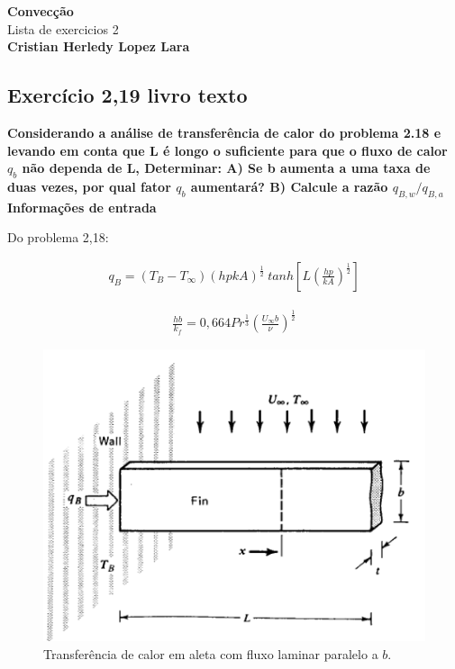 \documentclass[12pt]{article}
\title{}
\author{}
\begin{document}
\begin{center}
	{\tiny {\normalsize {\large \textbf{Convecção}\\ Lista de exercicios 2\\
	
	\textbf{Cristian Herledy Lopez Lara}}}}
\end{center}

\subsection*{Exercício 2,19 livro texto}


\textbf{Considerando a análise de transferência de calor do problema 2.18 e levando em conta que L é longo o suficiente para que o fluxo de calor $q_{b}$ não dependa de L, Determinar: A) Se b aumenta a uma taxa de duas vezes, por qual fator $q_{b}$ aumentará? B) Calcule a razão $q_{B,w}/q_{B,a}$} \\



\textbf{Informações de entrada} 

Do problema 2,18:

\begin{equation}
	\begin{aligned}
		q_{B} = (T_{B} - T_{\infty})(hpkA)^{\frac{1}{2}}\ tanh\left[L(\frac{hp}{kA})^{\frac{1}{2}}\right] 
	\end{aligned}
\end{equation}

\begin{equation}
	\begin{aligned}
		\frac{hb}{k_{f}}=0,664Pr^{\frac{1}{3}}\left(\frac{U_{\infty }b}{\nu} \right)^{\frac{1}{2}} 
	\end{aligned}
\end{equation}

\begin{figure}[H]
	\centering
	\includegraphics[width=.65\textwidth]{Figures/1_1}
	\caption{Transferência de calor em aleta com fluxo laminar paralelo a $b$.}
\end{figure}
\end{document}
